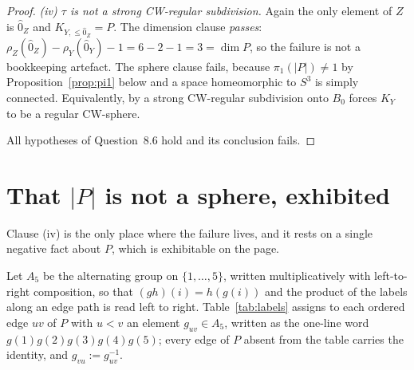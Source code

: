 \documentclass[11pt]{amsart}
\theoremstyle{definition}
\theoremstyle{remark}
\newcommand{\Ohat}{\widehat{0}}
\begin{document}
\begin{proof}
\emph{(iv) $\tau$ is not a strong CW-regular subdivision.} Again the only element of $Z$
is $\Ohat_Z$ and $K_{Y,\le\Ohat_Z}=P$. The dimension clause \emph{passes}:
$\rho_Z(\Ohat_Z)-\rho_Y(\Ohat_Y)-1=6-2-1=3=\dim P$, so the failure is not a bookkeeping
artefact. The sphere clause fails, because $\pi_1(|P|)\ne1$ by
Proposition~\ref{prop:pi1} below and a space homeomorphic to $S^3$ is simply connected.
Equivalently, by \cite[Example 7.16]{Stapledon} a strong CW-regular subdivision onto
$B_0$ forces $K_Y$ to be a regular CW-sphere.

All hypotheses of Question~8.6 hold and its conclusion fails.
\end{proof}

\section{That $|P|$ is not a sphere, exhibited}\label{sec:pi1}

Clause (iv) is the only place where the failure lives, and it rests on a single negative
fact about $P$, which is exhibitable on the page.

Let $A_5$ be the alternating group on $\{1,\dots,5\}$, written multiplicatively with
left-to-right composition, so that $(gh)(i)=h(g(i))$ and the product of the labels along
an edge path is read left to right. Table~\ref{tab:labels} assigns to each ordered edge
$uv$ of $P$ with $u<v$ an element $g_{uv}\in A_5$, written as the one-line word
$g(1)g(2)g(3)g(4)g(5)$; every edge of $P$ absent from the table carries the identity, and
$g_{vu}:=g_{uv}^{-1}$.
\end{document}
